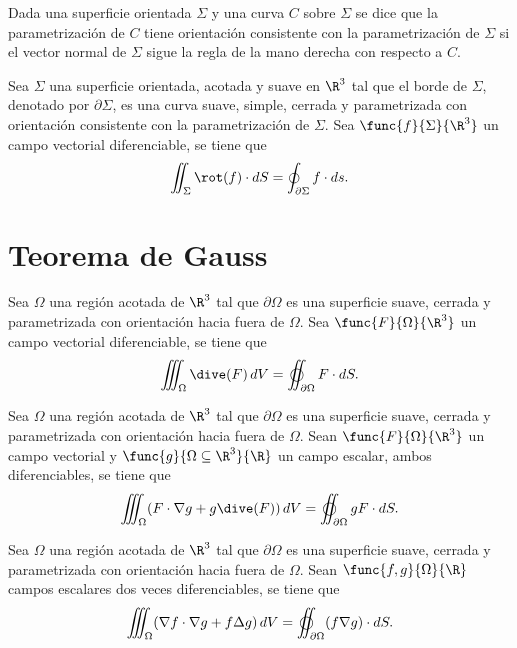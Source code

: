 \documentclass[a4,11pt]{aleph-notas}
\begin{document}
\begin{defi}
    Dada una superficie orientada $\Sigma$ y una curva $C$ sobre $\Sigma$ se dice que la parametrización de $C$ tiene orientación consistente con la parametrización de $\Sigma$ si el vector normal de $\Sigma$ sigue la regla de la mano derecha con respecto a $C$.
\end{defi}

\begin{teo}
    Sea $\Sigma$ una superficie orientada, acotada y suave en $\R^3$ tal que el borde de $\Sigma$, denotado por $\partial \Sigma$, es una curva suave, simple, cerrada y parametrizada con orientación consistente con la parametrización de $\Sigma$. Sea $\func{f}{\Sigma}{\R^3}$ un campo vectorial diferenciable, se tiene que
    \[
        \iint_\Sigma \rot(f) \cdot dS = \oint_{\partial \Sigma} f\cdot ds.
    \]
\end{teo}

\section{Teorema de Gauss}

\begin{teo}
    Sea $\Omega$ una región acotada de $\R^3$ tal que $\partial \Omega$ es una superficie suave, cerrada y parametrizada con orientación hacia fuera de $\Omega$. Sea $\func{F}{\Omega}{\R^3}$ un campo vectorial diferenciable, se tiene que
    \[
        \iiint_\Omega \dive(F) \, dV = \varoiint_{\partial \Omega} F\cdot dS.
    \]
\end{teo}

\begin{prop}
    Sea $\Omega$ una región acotada de $\R^3$ tal que $\partial \Omega$ es una superficie suave, cerrada y parametrizada con orientación hacia fuera de $\Omega$. Sean $\func{F}{\Omega}{\R^3}$ un campo vectorial y $\func{g}{\Omega\subseteq \R^3}{\R}$ un campo escalar, ambos diferenciables, se tiene que
    \[
        \iiint_{\Omega} (F \cdot \nabla g + g \dive(F))\, dV
        = \varoiint_{\partial \Omega}  g F \cdot dS.
    \]
\end{prop}

\begin{prop}
    Sea $\Omega$ una región acotada de $\R^3$ tal que $\partial \Omega$ es una superficie suave, cerrada y parametrizada con orientación hacia fuera de $\Omega$. Sean $\func{f,g}{\Omega}{\R}$ campos escalares dos veces diferenciables, se tiene que
    \[
        \iiint_\Omega (\nabla f\cdot \nabla g + f \Delta g) \, dV
        =
        \varoiint_{\partial \Omega} (f\nabla g) \cdot dS.
    \]
\end{prop}
\end{document}
